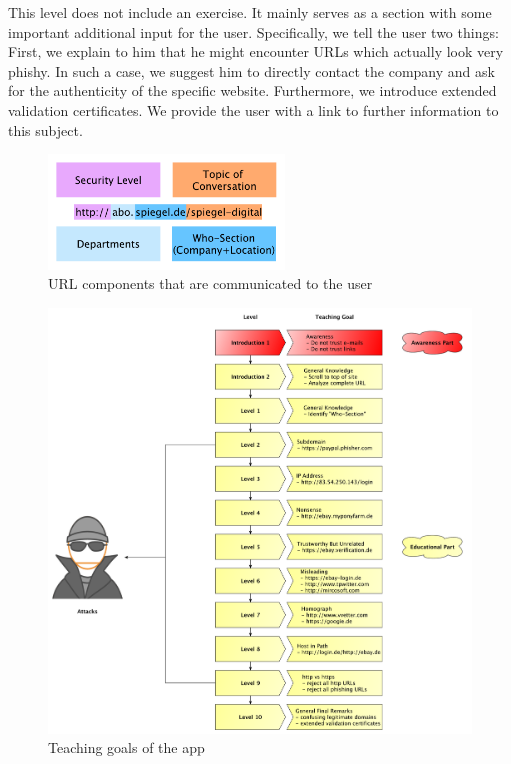 \begin{description}[leftmargin=0cm]
	\item[Level 10] This level does not include an exercise.
 It mainly serves as a section with some important additional input for the user.
 Specifically, we tell the user two things: First, we explain to him that he might encounter URLs which actually look very phishy.
 In such a case, we suggest him to directly contact the company and ask for the authenticity of the specific website.
 Furthermore, we introduce extended validation certificates.
 We provide the user with a link to further information to this subject.

\end{description}

\begin{figure}[hHtbp]
\centering
\includegraphics[width=0.56\textwidth]{graphix/url_components.pdf}
\caption{URL components that are communicated to the user}
\label{fig:url_components}
\end{figure}

\begin{figure}[hHtbp]
\centering
\includegraphics[width=1.0\textwidth]{graphix/level_teaching_goals.pdf}
\caption{Teaching goals of the app}
\label{fig:level_teaching_goals}
\end{figure}


